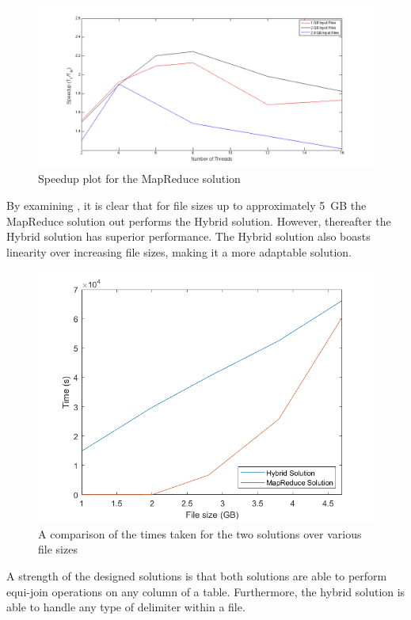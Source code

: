 \documentclass[12pt,twocolumn]{witseiepaper}
\begin{document}
\begin{figure}[h]
	\centering
	\includegraphics[width=1\columnwidth]{mapReduceSpeedup.png}
	\caption{Speedup plot for the MapReduce solution}
	\raggedright
	\label{fig:speedUpMR}	
\end{figure}

By examining , it is clear that for file sizes up to approximately 5~GB the MapReduce solution out performs the Hybrid solution. However, thereafter the Hybrid solution has superior performance. The Hybrid solution also boasts linearity over increasing file sizes, making it a more adaptable solution.

\begin{figure}[h]
	\centering
	\includegraphics[width=1\columnwidth]{comparison.png}
	\caption{A comparison of the times taken for the two solutions over various file sizes}
	\raggedright
	\label{fig:comparison}	
\end{figure}

A strength of the designed solutions is that both solutions are able to perform equi-join operations on any column of a table. Furthermore, the hybrid solution is able to handle any type of delimiter within a file.
\end{document}
